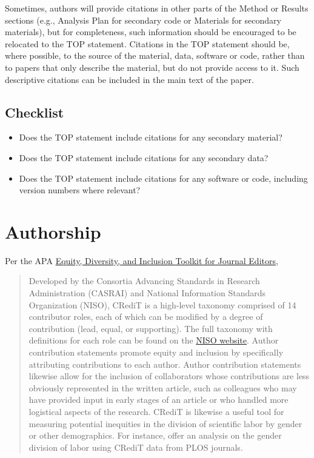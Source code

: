 \documentclass[
  oneside]{book}
\providecommand{\tightlist}{%
  \setlength{\itemsep}{0pt}\setlength{\parskip}{0pt}}
\begin{document}
Sometimes, authors will provide citations in other parts of the Method or Results sections (e.g., Analysis Plan for secondary code or Materials for secondary materials), but for completeness, such information should be encouraged to be relocated to the TOP statement. Citations in the TOP statement should be, where possible, to the source of the material, data, software or code, rather than to papers that only describe the material, but do not provide access to it. Such descriptive citations can be included in the main text of the paper.

\hypertarget{checklist-4}{%
\section{Checklist}\label{checklist-4}}

\begin{itemize}
\tightlist
\item
  Does the TOP statement include citations for any secondary material?
\item
  Does the TOP statement include citations for any secondary data?
\item
  Does the TOP statement include citations for any software or code, including version numbers where relevant?
\end{itemize}

\hypertarget{authorship}{%
\chapter{Authorship}\label{authorship}}

Per the APA \href{https://www.apa.org/pubs/authors/equity-diversity-inclusion-toolkit}{Equity, Diversity, and Inclusion Toolkit for Journal Editors},

\begin{quote}
Developed by the Consortia Advancing Standards in Research Administration (CASRAI) and National Information Standards Organization (NISO), CRediT is a high-level taxonomy comprised of 14 contributor roles, each of which can be modified by a degree of contribution (lead, equal, or supporting). The full taxonomy with definitions for each role can be found on the \href{https://casrai.org/credit/}{NISO website}. Author contribution statements promote equity and inclusion by specifically attributing contributions to each author. Author contribution statements likewise allow for the inclusion of collaborators whose contributions are less obviously represented in the written article, such as colleagues who may have provided input in early stages of an article or who handled more logistical aspects of the research. CRediT is likewise a useful tool for measuring potential inequities in the division of scientific labor by gender or other demographics. For instance, \citet{lariviere2021investigating} offer an analysis on the gender division of labor using CRediT data from PLOS journals.
\end{quote}
\end{document}
